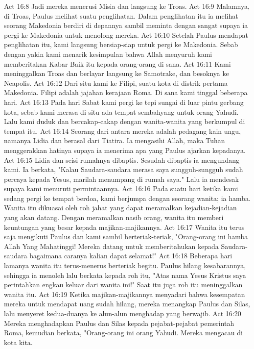 Act 16:8  Jadi mereka menerusi Misia dan langsung ke Troas.
Act 16:9  Malamnya, di Troas, Paulus melihat suatu penglihatan. Dalam penglihatan itu ia melihat seorang Makedonia berdiri di depannya sambil meminta dengan sangat supaya ia pergi ke Makedonia untuk menolong mereka.
Act 16:10  Setelah Paulus mendapat penglihatan itu, kami langsung bersiap-siap untuk pergi ke Makedonia. Sebab dengan yakin kami menarik kesimpulan bahwa Allah menyuruh kami memberitakan Kabar Baik itu kepada orang-orang di sana.
Act 16:11  Kami meninggalkan Troas dan berlayar langsung ke Samotrake, dan besoknya ke Neapolis.
Act 16:12  Dari situ kami ke Filipi, suatu kota di distrik pertama Makedonia. Filipi adalah jajahan kerajaan Roma. Di sana kami tinggal beberapa hari.
Act 16:13  Pada hari Sabat kami pergi ke tepi sungai di luar pintu gerbang kota, sebab kami merasa di situ ada tempat sembahyang untuk orang Yahudi. Lalu kami duduk dan bercakap-cakap dengan wanita-wanita yang berkumpul di tempat itu.
Act 16:14  Seorang dari antara mereka adalah pedagang kain ungu, namanya Lidia dan berasal dari Tiatira. Ia mengasihi Allah, maka Tuhan menggerakkan hatinya supaya ia menerima apa yang Paulus ajarkan kepadanya.
Act 16:15  Lidia dan seisi rumahnya dibaptis. Sesudah dibaptis ia mengundang kami. Ia berkata, "Kalau Saudara-saudara merasa saya sungguh-sungguh sudah percaya kepada Yesus, marilah menumpang di rumah saya." Lalu ia mendesak supaya kami menuruti permintaannya.
Act 16:16  Pada suatu hari ketika kami sedang pergi ke tempat berdoa, kami berjumpa dengan seorang wanita; ia hamba. Wanita itu dikuasai oleh roh jahat yang dapat meramalkan kejadian-kejadian yang akan datang. Dengan meramalkan nasib orang, wanita itu memberi keuntungan yang besar kepada majikan-majikannya.
Act 16:17  Wanita itu terus saja mengikuti Paulus dan kami sambil berteriak-teriak, "Orang-orang ini hamba Allah Yang Mahatinggi! Mereka datang untuk memberitahukan kepada Saudara-saudara bagaimana caranya kalian dapat selamat!"
Act 16:18  Beberapa hari lamanya wanita itu terus-menerus berteriak begitu. Paulus hilang kesabarannya, sehingga ia menoleh lalu berkata kepada roh itu, "Atas nama Yesus Kristus saya perintahkan engkau keluar dari wanita ini!" Saat itu juga roh itu meninggalkan wanita itu.
Act 16:19  Ketika majikan-majikannya menyadari bahwa kesempatan mereka untuk mendapat uang sudah hilang, mereka menangkap Paulus dan Silas, lalu menyeret kedua-duanya ke alun-alun menghadap yang berwajib.
Act 16:20  Mereka menghadapkan Paulus dan Silas kepada pejabat-pejabat pemerintah Roma, kemudian berkata, "Orang-orang ini orang Yahudi. Mereka mengacau di kota kita.
